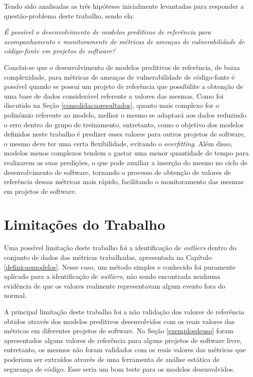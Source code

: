 Tendo sido analisadas as três hipóteses inicialmente levantadas para responder a
questão-problema deste trabalho, sendo ela: 

\begin{center}
  \textit{É possível o desenvolvimento de modelos preditivos de referência para
  acompanhamento e monitoramente de métricas de ameaças de vulnerabilidade de
código-fonte em projetos de software?}
\end{center}

Conclui-se que o desenvolvimento de modelos preditivos de referência, de baixa
complexidade, para métricas de ameaças de vulnerabilidade de código-fonte é
possível quando se possui um projeto de referência que possibilite a obtenção de
uma base de dados considerável referente a valores das mesmas. Como foi
discutido na Seção \ref{consolidacaoresultados}, quanto mais complexo for o
polinômio referente ao modelo, melhor o mesmo se adaptará aos dados reduzindo o
erro dentro do grupo de treinamento, entretanto, como o objetivo dos modelos
definidos neste trabalho é predizer esses valores para outros projetos de
software, o mesmo deve ter uma certa flexibilidade, evitando o
\textit{overfitting}. Além disso, modelos menos complexos tendem a gastar uma
menor quantidade de tempo para realizarem as suas predições, o que pode auxiliar a
inserção do mesmo no ciclo de desenvolvimento de software, tornando o processo
de obtenção de valores de referência dessas métricas mais rápido, facilitando o
monitoramento das mesmas em projetos de software.


\section{Limitações do Trabalho}

Uma possível limitação deste trabalho foi a identificação de \textit{outliers}
dentro do conjunto de dados das métricas trabalhadas, apresentada na Capítulo
\ref{definicaomodelos}. Nesse caso, um método simples e conhecido foi puramente
aplicado para a identificação de \textit{outliers}, não sendo encontrada nenhuma
evidência de que os valores realmente representavam algum evento fora do normal.

A principal limitação deste trabalho foi a não validação dos valores de
referência obtidos através dos modelos preditivos desenvolvidos com os reais
valores das métricas em diferentes projetos de software. Na Seção
\ref{exemplosdeuso} foram apresentados alguns valores de referência para alguns
projetos de software livre, entretanto, os mesmos não foram validados com os
reais valores das métricas que poderiam ser extraídos através de uma ferramenta
de análise estática de segurança de código. Esse seria um bom teste para os
modelos desenvolvidos.

